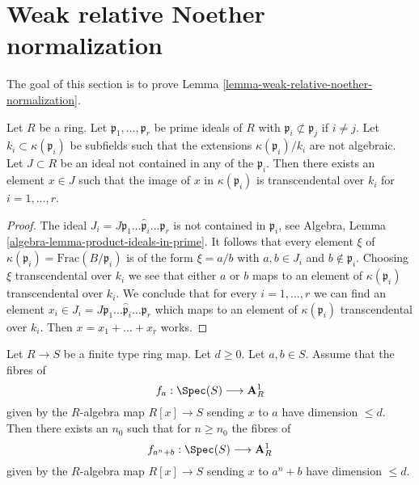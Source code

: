 \section{Weak relative Noether normalization}
\label{section-relative-noether-normalization}

\noindent
The goal of this section is to prove
Lemma \ref{lemma-weak-relative-noether-normalization}.

\begin{lemma}
\label{lemma-silly}
Let $R$ be a ring. Let $\mathfrak p_1, \ldots, \mathfrak p_r$
be prime ideals of $R$ with $\mathfrak p_i \not \subset \mathfrak p_j$
if $i \not = j$. Let $k_i \subset \kappa(\mathfrak p_i)$ be
subfields such that the extensions $\kappa(\mathfrak p_i)/k_i$
are not algebraic. Let $J \subset R$ be an ideal not contained
in any of the $\mathfrak p_i$. Then there exists an element $x \in J$
such that the image of $x$ in $\kappa(\mathfrak p_i)$
is transcendental over $k_i$ for $i = 1, \ldots, r$.
\end{lemma}

\begin{proof}
The ideal
$J_i = J \mathfrak p_1 \ldots \hat{\mathfrak p}_i \ldots \mathfrak p_r$ is not
contained in $\mathfrak p_i$, see
Algebra, Lemma \ref{algebra-lemma-product-ideals-in-prime}.
It follows that every element $\xi$ of
$\kappa(\mathfrak p_i) = \text{Frac}(B/\mathfrak p_i)$
is of the form $\xi = a/b$ with $a, b \in J_i$
and $b \not \in \mathfrak p_i$. Choosing $\xi$ transcendental
over $k_i$ we see that either $a$ or $b$ maps to an element
of $\kappa(\mathfrak p_i)$ transcendental over $k_i$.
We conclude that for every $i = 1, \ldots, r$
we can find an element
$x_i \in J_i = J \mathfrak p_1 \ldots \hat{\mathfrak p}_i \ldots \mathfrak p_r$
which maps to an element of $\kappa(\mathfrak p_i)$
transcendental over $k_i$. Then $x = x_1 + \ldots + x_r$ works.
\end{proof}

\begin{lemma}
\label{lemma-sum-is-ok}
Let $R \to S$ be a finite type ring map. Let $d \geq 0$. Let $a, b \in S$.
Assume that the fibres of
$$
f_a : \Spec(S) \longrightarrow \mathbf{A}^1_R
$$
given by the $R$-algebra map $R[x] \to S$ sending $x$ to $a$
have dimension $\leq d$. Then there exists an $n_0$ such that for
$n \geq n_0$ the fibres of
$$
f_{a^n + b} : \Spec(S) \longrightarrow \mathbf{A}^1_R
$$
given by the $R$-algebra map $R[x] \to S$ sending $x$ to $a^n + b$
have dimension $\leq d$.
\end{lemma}

